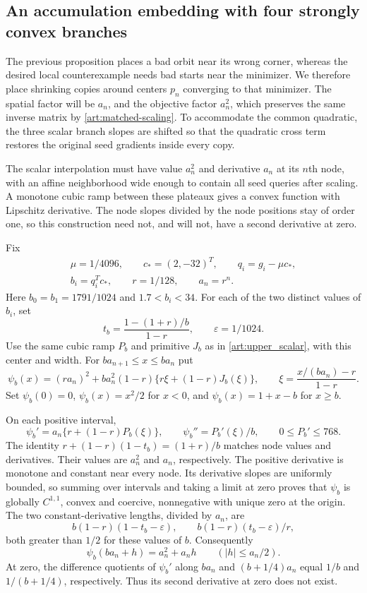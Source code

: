 \subsection{An accumulation embedding with four strongly convex branches}
The previous proposition places a bad orbit near its wrong corner,
whereas the desired local counterexample needs bad starts near the
minimizer. We therefore place shrinking copies around centers $p_n$
converging to that minimizer. The spatial factor will be $a_n$, and the
objective factor $a_n^2$, which preserves the same inverse matrix by
\eqref{art:matched-scaling}. To accommodate the common quadratic, the
three scalar branch slopes are shifted so that the quadratic cross term
restores the original seed gradients inside every copy.

The scalar interpolation must have value $a_n^2$ and derivative $a_n$
at its $n$th node, with an affine neighborhood wide enough to contain
all seed queries after scaling. A monotone cubic ramp between these
plateaux gives a convex function with Lipschitz derivative. The node
slopes divided by the node positions stay of order one, so this
construction need not, and will not, have a second derivative at zero.

Fix
\begin{gather*}
 \mu=1/4096,\qquad c_*=(2,-32)^T,\qquad q_i=g_i-\mu c_*,\\
 b_i=q_i^Tc_*,\qquad r=1/128,\qquad a_n=r^n.
\end{gather*}
Here $b_0=b_1=1791/1024$ and $1.7<b_i<34$. For each of the two distinct
values of $b_i$, set
\[
 t_b=\frac{1-(1+r)/b}{1-r},\qquad\varepsilon=1/1024.
\]
Use the same cubic ramp $P_b$ and primitive $J_b$ as in
\eqref{art:upper_scalar}, with this center and width. For
$ba_{n+1}\le x\le ba_n$ put
\begin{equation}\label{art:lower_scalar}
 \psi_b(x)=(ra_n)^2+ba_n^2(1-r)
       \{r\xi+(1-r)J_b(\xi)\},\qquad
 \xi=\frac{x/(ba_n)-r}{1-r}.
\end{equation}
Set $\psi_b(0)=0$, $\psi_b(x)=x^2/2$ for $x<0$, and
$\psi_b(x)=1+x-b$ for $x\ge b$.

On each positive interval,
\[
 \psi_b'=a_n\{r+(1-r)P_b(\xi)\},\qquad
 \psi_b''=P_b'(\xi)/b,\qquad0\le P_b'\le768.
\]
The identity $r+(1-r)(1-t_b)=(1+r)/b$ matches node values and
derivatives. Their values are $a_n^2$ and $a_n$, respectively.
The positive derivative is monotone and constant near every node.
Its derivative slopes are uniformly bounded, so summing over intervals
and taking a limit at zero proves that $\psi_b$ is globally $C^{1,1}$,
convex and coercive, nonnegative with unique zero at the origin.
The two constant-derivative lengths, divided by $a_n$, are
\[
 b(1-r)(1-t_b-\varepsilon),\qquad
 b(1-r)(t_b-\varepsilon)/r,
\]
both greater than $1/2$ for these values of $b$. Consequently
\begin{equation}\label{art:lower_plateau}
 \psi_b(ba_n+h)=a_n^2+a_nh\qquad(|h|\le a_n/2).
\end{equation}
At zero, the difference quotients of $\psi_b'$ along $ba_n$ and
$(b+1/4)a_n$ equal $1/b$ and $1/(b+1/4)$, respectively. Thus its second
derivative at zero does not exist.

